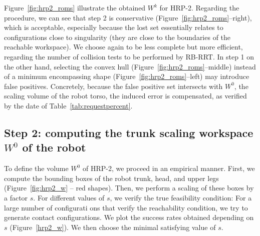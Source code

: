 Figure~\ref{fig:hrp2_roms} illustrate the obtained $W^k$ for HRP-2.
Regarding the procedure, we can see that step 2 is conservative (Figure~\ref{fig:hrp2_roms}--right), which 
is acceptable, especially because the lost set essentially relates to configurations close to singularity (they are close to the boundaries of the reachable workspace). We choose again to be less complete
but more efficient, regarding the number of collision tests to be performed by RB-RRT.
In step 1 on the other hand, selecting the convex hull (Figure~\ref{fig:hrp2_roms}--middle) instead of a minimum encompassing shape (Figure~\ref{fig:hrp2_roms}--left) may introduce false positives.
Concretely, because the false positive set intersects with $W^0$, the scaling volume of the robot torso, the induced error is compensated,
as verified by the date of Table~\ref{tab:requestpercent}.

\subsection{Step 2: computing the trunk scaling workspace $W^0$ of the robot}
To define the volume $W^0$ of HRP-2, we proceed in an empirical manner.
First, we compute the bounding boxes of the robot trunk, head, and upper legs (Figure~\ref{fig:hrp2_w} -- red shapes).
Then, we perform a scaling of these boxes by a factor $s$. For different values of $s$, we verify the true feasibility condition:
For a large number of configurati
ons that verify the reachability condition, we try to generate contact configurations. We plot 
the success rates obtained depending on $s$ (Figure~\ref{hrp2_w}). We then choose the minimal satisfying value of $s$.

